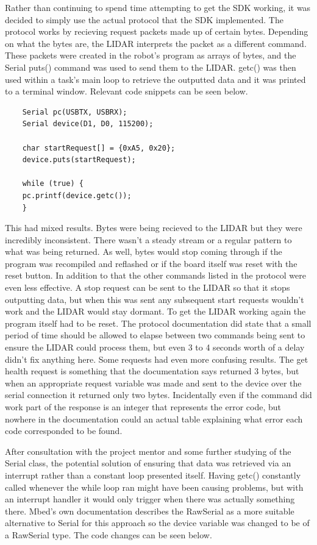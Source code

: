 	Rather than continuing to spend time attempting to get the SDK working, it was decided to simply use the actual protocol that the SDK implemented. The protocol works by recieving request packets made up of certain bytes. Depending on what the bytes are, the LIDAR interprets the packet as a different command. These packets were created in the robot's program as arrays of bytes, and the Serial puts() command was used to send them to the LIDAR. getc() was then used within a task's main loop to retrieve the outputted data and it was printed to a terminal window. Relevant code snippets can be seen below.
	\begin{lstlisting}
	Serial pc(USBTX, USBRX);
	Serial device(D1, D0, 115200);
	
	char startRequest[] = {0xA5, 0x20};
	device.puts(startRequest);
	
	while (true) {
	pc.printf(device.getc()); 
	}
	\end{lstlisting}
	This had mixed results. Bytes were being recieved to the LIDAR but they were incredibly inconsistent. There wasn't a steady stream or a regular pattern to what was being returned. As well, bytes would stop coming through if the program was recompiled and reflashed or if the board itself was reset with the reset button. In addition to that the other commands listed in the protocol were even less effective. A stop request can be sent to the LIDAR so that it stops outputting data, but when this was sent any subsequent start requests wouldn't work and the LIDAR would stay dormant. To get the LIDAR working again the program itself had to be reset. The protocol documentation did state that a small period of time should be allowed to elapse between two commands being sent to ensure the LIDAR could process them, but even 3 to 4 seconds worth of a delay didn't fix anything here. Some requests had even more confusing results. The get health request is something that the documentation says returned 3 bytes, but when an appropriate request variable was made and sent to the device over the serial connection it returned only two bytes. Incidentally even if the command did work part of the response is an integer that represents the error code, but nowhere in the documentation could an actual table explaining what error each code corresponded to be found. 
	
	After consultation with the project mentor and some further studying of the Serial class, the potential solution of ensuring that data was retrieved via an interrupt rather than a constant loop presented itself. Having getc() constantly called whenever the while loop ran might have been causing problems, but with an interrupt handler it would only trigger when there was actually something there. Mbed's own documentation describes the RawSerial as a more suitable alternative to Serial for this approach so the device variable was changed to be of a RawSerial type. The code changes can be seen below.
	
